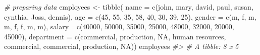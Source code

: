 \documentclass[
]{book}
\newenvironment{Shaded}{\begin{snugshade}}{\end{snugshade}}
\newcommand{\AttributeTok}[1]{\textcolor[rgb]{0.77,0.63,0.00}{#1}}
\newcommand{\CommentTok}[1]{\textcolor[rgb]{0.56,0.35,0.01}{\textit{#1}}}
\newcommand{\ConstantTok}[1]{\textcolor[rgb]{0.00,0.00,0.00}{#1}}
\newcommand{\DecValTok}[1]{\textcolor[rgb]{0.00,0.00,0.81}{#1}}
\newcommand{\FunctionTok}[1]{\textcolor[rgb]{0.00,0.00,0.00}{#1}}
\newcommand{\NormalTok}[1]{#1}
\newcommand{\OtherTok}[1]{\textcolor[rgb]{0.56,0.35,0.01}{#1}}
\newcommand{\StringTok}[1]{\textcolor[rgb]{0.31,0.60,0.02}{#1}}
\begin{document}
\begin{Shaded}
\begin{Highlighting}[]
\CommentTok{\# preparing data}
\NormalTok{employees }\OtherTok{\textless{}{-}} \FunctionTok{tibble}\NormalTok{(}
    \AttributeTok{name =} \FunctionTok{c}\NormalTok{(}\StringTok{\textquotesingle{}john\textquotesingle{}}\NormalTok{, }\StringTok{\textquotesingle{}mary\textquotesingle{}}\NormalTok{, }\StringTok{\textquotesingle{}david\textquotesingle{}}\NormalTok{, }\StringTok{\textquotesingle{}paul\textquotesingle{}}\NormalTok{, }\StringTok{\textquotesingle{}susan\textquotesingle{}}\NormalTok{, }\StringTok{\textquotesingle{}cynthia\textquotesingle{}}\NormalTok{, }\StringTok{\textquotesingle{}Joss\textquotesingle{}}\NormalTok{, }\StringTok{\textquotesingle{}dennis\textquotesingle{}}\NormalTok{),}
    \AttributeTok{age =} \FunctionTok{c}\NormalTok{(}\DecValTok{45}\NormalTok{, }\DecValTok{55}\NormalTok{, }\DecValTok{35}\NormalTok{, }\DecValTok{58}\NormalTok{, }\DecValTok{40}\NormalTok{, }\DecValTok{30}\NormalTok{, }\DecValTok{39}\NormalTok{, }\DecValTok{25}\NormalTok{),}
    \AttributeTok{gender =} \FunctionTok{c}\NormalTok{(}\StringTok{\textquotesingle{}m\textquotesingle{}}\NormalTok{, }\StringTok{\textquotesingle{}f\textquotesingle{}}\NormalTok{, }\StringTok{\textquotesingle{}m\textquotesingle{}}\NormalTok{, }\StringTok{\textquotesingle{}m\textquotesingle{}}\NormalTok{, }\StringTok{\textquotesingle{}f\textquotesingle{}}\NormalTok{, }\StringTok{\textquotesingle{}f\textquotesingle{}}\NormalTok{, }\StringTok{\textquotesingle{}m\textquotesingle{}}\NormalTok{, }\StringTok{\textquotesingle{}m\textquotesingle{}}\NormalTok{),}
    \AttributeTok{salary =}\FunctionTok{c}\NormalTok{(}\DecValTok{40000}\NormalTok{, }\DecValTok{50000}\NormalTok{, }\DecValTok{35000}\NormalTok{, }\DecValTok{25000}\NormalTok{, }\DecValTok{48000}\NormalTok{, }\DecValTok{32000}\NormalTok{, }\DecValTok{20000}\NormalTok{, }\DecValTok{45000}\NormalTok{),}
    \AttributeTok{department =} \FunctionTok{c}\NormalTok{(}\StringTok{\textquotesingle{}commercial\textquotesingle{}}\NormalTok{, }\StringTok{\textquotesingle{}production\textquotesingle{}}\NormalTok{, }\ConstantTok{NA}\NormalTok{, }\StringTok{\textquotesingle{}human resources\textquotesingle{}}\NormalTok{, }
                   \StringTok{\textquotesingle{}commercial\textquotesingle{}}\NormalTok{, }\StringTok{\textquotesingle{}commercial\textquotesingle{}}\NormalTok{, }\StringTok{\textquotesingle{}production\textquotesingle{}}\NormalTok{, }\ConstantTok{NA}\NormalTok{))}
\NormalTok{employees}
\CommentTok{\#\textgreater{} \# A tibble: 8 x 5}

\end{Highlighting}
\end{Shaded}
\end{document}
